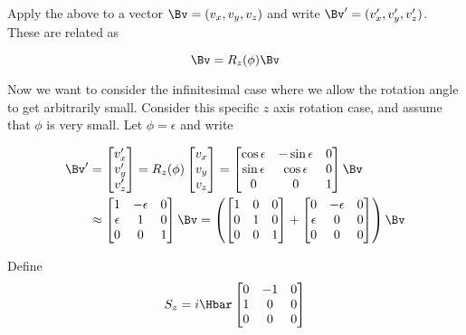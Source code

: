 Apply the above to a vector \(\Bv = (v_x, v_y, v_z)\) and write \(\Bv' = (v_x', v_y', v_z')\).  These are related as

\begin{equation}\label{eqn:PHY356FDec7:40}
\Bv = R_z(\phi) \Bv
\end{equation}

Now we want to consider the infinitesimal case where we allow the rotation angle to get arbitrarily small.  Consider this specific \(z\) axis rotation case, and assume that \(\phi\) is very small.  Let \(\phi = \epsilon\) and write

\begin{equation}\label{eqn:PHY356FDec7:55}
\begin{aligned}
\Bv' &=
\begin{bmatrix}
v_x'  \\
v_y' \\
v_z'
\end{bmatrix}
=
R_z(\phi)
\begin{bmatrix}
v_x \\
v_y \\
v_z
\end{bmatrix}
=
\begin{bmatrix}
\cos \epsilon &- \sin\epsilon & 0 \\
\sin \epsilon & \cos\epsilon & 0 \\
0 & 0 & 1
\end{bmatrix}
\Bv \\
&\approx
\begin{bmatrix}
1 &- \epsilon & 0 \\
\epsilon & 1 & 0 \\
0 & 0 & 1
\end{bmatrix}
\Bv
=
\left(
\begin{bmatrix}
1 & 0 & 0 \\
0 & 1 & 0 \\
0 & 0 & 1
\end{bmatrix}
+
\begin{bmatrix}
0 &- \epsilon & 0 \\
\epsilon & 0 & 0 \\
0 & 0 & 0
\end{bmatrix}
\right)
\Bv
\end{aligned}
\end{equation}

Define
\begin{equation}\label{eqn:PHY356FDec7:60}
S_z = i \Hbar
\begin{bmatrix}
0 &- 1 & 0 \\
1 & 0 & 0 \\
0 & 0 & 0
\end{bmatrix}
\end{equation}

